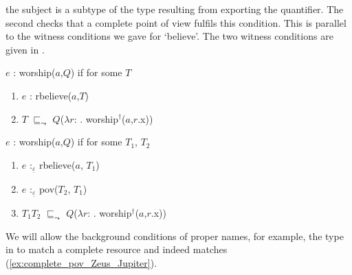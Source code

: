 the subject is a subtype of the type resulting from exporting the
quantifier.  The second checks that a complete point of view fulfils
this condition.  This is parallel to the witness conditions we gave
for `believe'.  The two witness conditions are given in \nexteg{}.
\begin{ex} 
\begin{subex} 
 
\item $e$ : worship($a$,$Q$) if for some $T$
\begin{enumerate} 
 
\item $e$ : rbelieve($a$,$T$) 
 
\item $T$ $\sqsubseteq_{\leadsto}$ $Q$($\lambda
  r$: . worship$^\dagger$($a$,$r$.x))
 
\end{enumerate} 
 
 
\item $e$ : worship($a$,$Q$) if for some $T_1$, $T_2$
\begin{enumerate} 
 
\item $e$ :$_{\underline{\varepsilon}}$ rbelieve($a$, $T_1$)

\item $e$ :$_{\underline{\varepsilon}}$ pov($T_2$, $T_1$)
 
\item $T_1$\fbox{\d{$\wedge$}}$T_2$ $\sqsubseteq_{\leadsto}$ $Q$($\lambda
  r$:
  . worship$^\dagger$($a$,$r$.x)) 

\end{enumerate}
 
\end{subex}
\label{ex:witness_cond_worship_pov} 
   
\end{ex}   

We will allow the background conditions of proper names, for example,
the type in \nexteg{} to match a complete resource and indeed
\nexteg{} matches (\ref{ex:complete_pov_Zeus_Jupiter}).
\begin{ex} 
 

   
\end{ex} 
 
